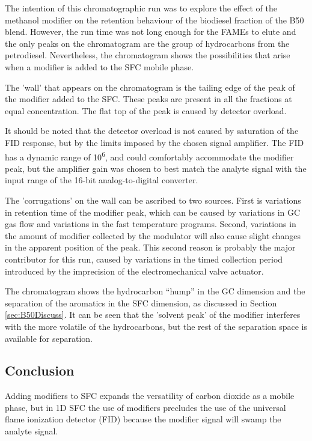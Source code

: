The intention of this chromatographic run was to explore the effect of the
meth\-anol modifier on the retention behaviour of the biodiesel fraction of the
B50 blend. However, the run time was not long enough for the FAMEs to elute and
the only peaks on the chromatogram are the group of hydrocarbons from the
petrodiesel. Nevertheless, the chromatogram shows the possibilities that arise
when a modifier is added to the SFC mobile phase.

The 'wall' that appears on the chromatogram is the tailing edge of the peak of
the modifier added to the SFC. These peaks are present in all the fractions at
equal concentration. The flat top of the peak is caused by detector overload. 

It should be noted that the detector overload is not caused by saturation of the
FID response, but by the limits imposed by the chosen signal amplifier. The FID
has a dynamic range of 10\textsuperscript{6}, and could comfortably accommodate
the modifier peak, but the amplifier gain was chosen to best match the analyte signal
with the input range of the 16-bit analog-to-digital converter.

The 'corrugations' on the wall can be ascribed to two sources. First is
variations in retention time of the modifier peak, which can be caused by
variations in GC gas flow and variations in the fast temperature programs.
Second, variations in the amount of modifier collected by the modulator will
also cause slight changes in the apparent position of the peak. This second
reason is probably the major contributor for this run, caused by variations in
the timed collection period introduced by the imprecision of the
electromechanical valve actuator.

The chromatogram shows the hydrocarbon ``hump'' in the GC dimension and the
separation of the aromatics in the SFC dimension, as discussed in Section
\ref{sec:B50Discuss}. It can be seen that the 'solvent peak' of the modifier
interferes with the more volatile of the hydrocarbons, but the rest of the
separation space is available for separation. 

\subsection{Conclusion}

Adding modifiers to SFC expands the versatility of carbon dioxide as a mobile
phase, but in 1D SFC the use of modifiers precludes the use of the universal
flame ionization detector (FID) because the modifier signal will swamp the
analyte signal.


